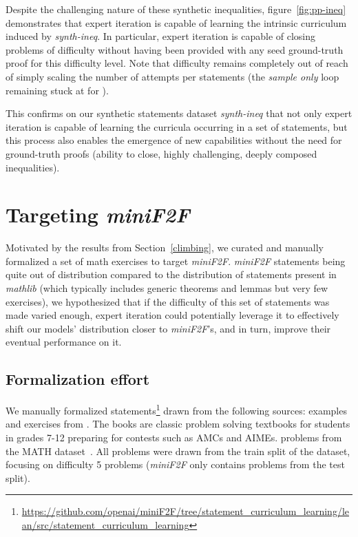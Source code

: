 \documentclass[nohyperref]{article}
\theoremstyle{plain}
\theoremstyle{definition}
\theoremstyle{remark}
\begin{document}
Despite the challenging nature of these synthetic inequalities, figure~\ref{fig:pp-ineq} demonstrates that expert iteration is capable of learning the intrinsic curriculum induced by \textit{synth-ineq}. In particular, expert iteration is capable of closing  problems of difficulty  without having been provided with any seed ground-truth proof for this difficulty level. Note that difficulty  remains completely out of reach of simply scaling the number of attempts per statements (the \textit{sample only} loop remaining stuck at  for ).

This confirms on our synthetic statements dataset \textit{synth-ineq} that not only expert iteration is capable of learning the curricula occurring in a set of statements, but this process also enables the emergence of new capabilities without the need for ground-truth proofs (ability to close, highly challenging, deeply composed inequalities).

\section{Targeting \textit{miniF2F}}

Motivated by the results from Section~\ref{climbing}, we curated and manually formalized a set of math exercises to target \textit{miniF2F}. \textit{miniF2F} statements being quite out of distribution compared to the distribution of statements present in \textit{mathlib} (which typically includes generic theorems and lemmas but very few exercises), we hypothesized that if the difficulty of this set of statements was made varied enough, expert iteration could potentially leverage it to effectively shift our models' distribution closer to \textit{miniF2F}'s, and in turn, improve their eventual performance on it.

\subsection{Formalization effort}

We manually formalized  statements\footnote{\url{https://github.com/openai/miniF2F/tree/statement_curriculum_learning/lean/src/statement_curriculum_learning}} drawn from the following sources:  examples and exercises from \citet{aopsv1,aopsv2}. The books are classic problem solving textbooks for students in grades 7-12 preparing for contests such as AMCs and AIMEs.  problems from the MATH dataset~\cite{hendrycks2021measuring}. All problems were drawn from the train split of the dataset, focusing on difficulty 5 problems (\textit{miniF2F} only contains problems from the test split).
\end{document}
